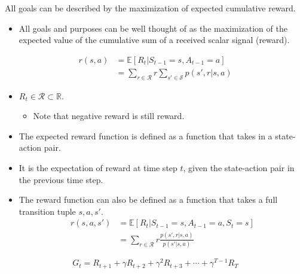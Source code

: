 \begin{definition}
	All goals can be described by the maximization of expected cumulative reward.
\end{definition}
\begin{itemize}
	\item All goals and purposes can be well thought of as the maximization of the expected value of the cumulative sum of a received scalar signal (\ie reward).
\end{itemize}

\begin{definition}
	\begin{align*}
		r(s,a)&= \mathbb{E}[R_t|S_{t-1}=s,A_{t-1}=a]\\
		&= \sum_{r\in \mathcal{R}}r\sum_{s'\in \mathcal{S}}p(s',r|s,a)
	\end{align*}
\end{definition}
\begin{itemize}
	\item $R_t\in \mathcal{R} \subset \mathbb{R}.$ 
		\begin{itemize}
			\item Note that negative reward is still reward.
		\end{itemize}
	\item The expected reward function is defined as a function that takes in a state-action pair.
	\item It is the expectation of reward at time step $t$, given the state-action pair in the previous time step.
	\item The reward function can also be defined as a function that takes a full transition tuple $s,a,s'$.
		\begin{align*}
			r(s,a,s')&= \mathbb{E}[R_t|S_{t-1}=s,A_{t-1}=a,S_{t}=s]\\
			&= \sum_{r\in \mathcal{R}}r\frac{p(s',r|s,a)}{p(s'|s,a)}
		\end{align*}
\end{itemize}

\begin{definition}
	$$G_t = R_{t+1}+\gamma R_{t+2}+\gamma^2 R_{t+3}+\cdots+\gamma^{T-1} R_{T} $$
\end{definition}

